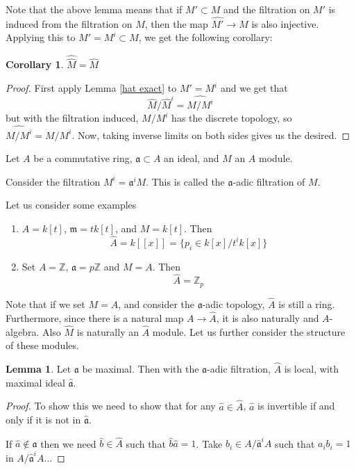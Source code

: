 \documentclass[12 pt]{article}
\theoremstyle{definition}
\newtheorem{corollary}[theorem]{Corollary}
\newtheorem{lemma}[theorem]{Lemma}
\newcommand\zz{\mathbb{Z}}
\newcommand\fa{{\mathfrak a}}
\begin{document}
Note that the above lemma means that if $M' \subset M$ and the filtration on $M'$ is induced from the filtration on $M$, then the map $\widehat{M'} \to M$ is also injective. Applying this to $M'=M^i \subset M$, we get the following corollary:
\begin{corollary} $\widehat{\widehat M}=\widehat{M}$
\end{corollary}
\begin{proof} First apply Lemma \ref{hat exact} to $M'=M^i$ and we get that
\[\widehat M/\widehat{M}^i =\widehat{M/M^i}\]
but with the filtration induced, $M/M^i$ has the discrete topology, so $\widehat{M/M^i}=M/M^i$. Now, taking inverse limits on both sides gives us the desired.
\end{proof}


Let $A$ be a commutative ring, $\fa \subset A$ an ideal, and $M$ an $A$ module.
\begin{definition} Consider the filtration $M^i=\fa^iM$. This is called the $\fa$-adic filtration of $M$.
\end{definition}

Let us consider some examples
\begin{enumerate}
\item $A=k[t]$, $\mathfrak{m}=tk[t]$, and $M=k[t]$. Then
\[\hat{A}=k[[x]]=\{p_i \in k[x]/t^ik[x]\}\]

\item Set $A=\zz$, $\fa=p\zz$ and $M=A$. Then
\[\hat{A}=\zz_p\]
\end{enumerate}

Note that if we set $M=A$, and consider the $\fa$-adic topology, $\hat{A}$ is still a ring. Furthermore, since there is a natural map $A \to \hat{A}$, it is also naturally and $A$-algebra. Also $\hat{M}$ is naturally an $\hat{A}$ module. Let us further consider the structure of these modules.

\begin{lemma} Let $\fa$ be maximal. Then with the $\fa$-adic filtration, $\widehat{A}$ is local, with maximal ideal $\hat{\fa}$.
\label{completion local}
\end{lemma}
\begin{proof} To show this we need to show that for any $\hat{a} \in \hat{A}$, $\hat{a}$ is invertible if and only if it is not in $\hat{\fa}$.

If $\hat{a} \not \in \hat{\fa}$ then we need $\hat{b} \in \hat{A}$ such that $\hat{b}\hat{a}=1$. Take $b_i \in A/\hat{\fa}^iA$ such that $a_ib_i=1$ in $A/\hat{\fa}^iA$...
\end{proof}
\end{document}
